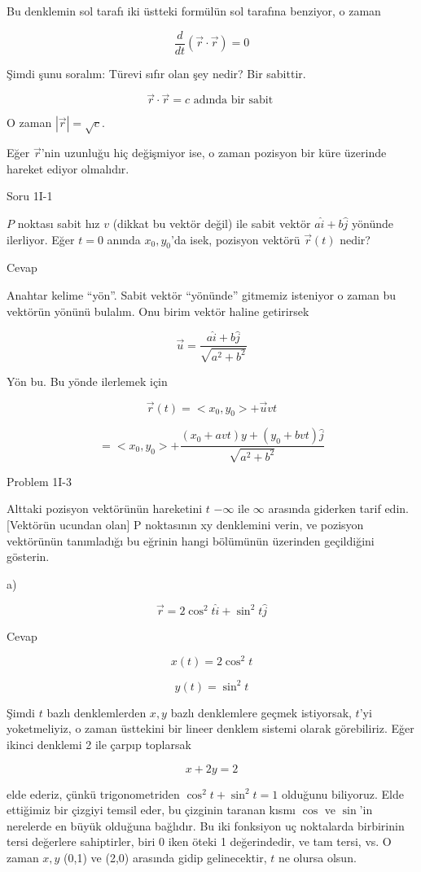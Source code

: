 \documentclass[12pt,fleqn]{article}\usepackage{../../common}
\begin{document}
Bu denklemin sol tarafı iki üstteki formülün sol tarafına benziyor, o zaman

$$ \frac{d}{dt}(\vec{r} \cdot \vec{r}) = 0 $$

Şimdi şunu soralım: Türevi sıfır olan şey nedir? Bir sabittir. 

$$ \vec{r} \cdot \vec{r} = c \textrm{ adında bir sabit }$$

O zaman $|\vec{r}| = \sqrt{c}$. 

Eğer $\vec{r}$'nin uzunluğu hiç değişmiyor ise, o zaman pozisyon bir küre
üzerinde hareket ediyor olmalıdır.

Soru 1I-1

$P$ noktası sabit hız $v$ (dikkat bu vektör değil) ile sabit vektör
$a\hat{i}+b\hat{j}$ yönünde ilerliyor. Eğer $t=0$ anında $x_0,y_0$'da isek,
pozisyon vektörü $\vec{r}(t)$ nedir?

Cevap

Anahtar kelime ``yön''. Sabit vektör ``yönünde'' gitmemiz isteniyor o zaman
bu vektörün yönünü bulalım. Onu birim vektör haline getirirsek 

$$ \vec{u} = \frac{a\hat{i}+b\hat{j}}{\sqrt{a^2+b^2}} $$

Yön bu. Bu yönde ilerlemek için 

$$ \vec{r}(t) = < x_0,y_0 > + \vec{u}vt $$

$$  = < x_0,y_0 > + \frac{(x_0+avt)y+(y_0 + bvt)\hat{j}}{\sqrt{a^2+b^2}}$$

Problem 1I-3

Alttaki pozisyon vektörünün hareketini $t$ $-\infty$ ile $\infty$ arasında
giderken tarif edin. [Vektörün ucundan olan] P noktasının xy denklemini
verin, ve pozisyon vektörünün tanımladığı bu eğrinin hangi bölümünün
üzerinden geçildiğini gösterin. 

a) 

$$ \vec{r} = 2\cos^2t \hat{i} + \sin^2t \hat{j}  $$

Cevap

$$ x(t) = 2\cos^2t $$

$$ y(t) = \sin^2t $$

Şimdi $t$ bazlı denklemlerden $x,y$ bazlı denklemlere geçmek istiyorsak, $t$'yi
yoketmeliyiz, o zaman üsttekini bir lineer denklem sistemi olarak
görebiliriz. Eğer ikinci denklemi 2 ile çarpıp toplarsak

$$ x + 2y = 2 $$

elde ederiz, çünkü trigonometriden $\cos^2t + \sin^2t = 1$ olduğunu
biliyoruz. Elde ettiğimiz bir çizgiyi temsil eder, bu çizginin taranan kısmı
$\cos$ ve $\sin$'in nerelerde en büyük olduğuna bağlıdır. Bu iki fonksiyon uç
noktalarda birbirinin tersi değerlere sahiptirler, biri 0 iken öteki 1
değerindedir, ve tam tersi, vs. O zaman $x,y$ (0,1) ve (2,0) arasında gidip
gelinecektir, $t$ ne olursa olsun.
\end{document}
